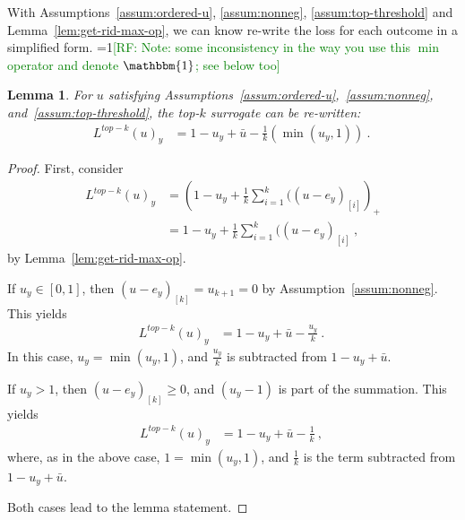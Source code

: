 \documentclass[12pt]{article}
\newcommand{\Comments}{1}
\newcommand{\mynote}[2]{\ifnum\Comments=1\textcolor{#1}{#2}\fi}
\newcommand{\raf}[1]{\mynote{green}{[RF: #1]}}
\newcommand{\jessie}[1]{\mynote{purple}{[JF: #1]}}
\newcommand{\ubar}{\bar{u}}
\newcommand{\ones}{\mathbbm{1}}
\newtheorem{lemma}{Lemma}
\begin{document}
With Assumptions~\ref{assum:ordered-u}, \ref{assum:nonneg}, \ref{assum:top-threshold} and Lemma~\ref{lem:get-rid-max-op}, we can know re-write the loss for each outcome in a simplified form.
\raf{Note: some inconsistency in the way you use this $\min$ operator and denote $\ones$; see below too}
\begin{lemma}\label{lem:new-form-surrogate}
	For $u$ satisfying Assumptions~\ref{assum:ordered-u},~\ref{assum:nonneg}, and~\ref{assum:top-threshold}, the top-$k$ surrogate can be re-written:
\begin{align*} 
L^{top-k}(u)_y  &= 1 - u_y + \bar u - \frac{1}{k}(\min(u_y, 1))~.~
\end{align*}
\end{lemma}
\begin{proof}
	First, consider
\begin{align*}
	L^{top-k}(u)_y &= \left(1 -u_y + \frac{1}{k} \sum_{i=1}^k ((u - e_y)_{[i]} \right)_+\\
	&= 1 -u_y + \frac{1}{k} \sum_{i=1}^k ((u - e_y)_{[i]}~,
	\end{align*}
	by Lemma~\ref{lem:get-rid-max-op}.

	
	If $u_y \in [0,1]$, then $(u-e_y)_{[k]} = u_{k+1} = 0$ by Assumption~\ref{assum:nonneg}.
	This yields
	\begin{align*}
	L^{top-k}(u)_y &= 1 - u_y + \bar u - \frac{u_y}{k}~.~
	\end{align*}
	In this case, $u_y = \min(u_y, 1)$, and $\frac {u_y}{k}$ is subtracted from $1 - u_y + \bar u$.

	If $u_y > 1$, then $(u-e_y)_{[k]} \geq 0$, and $(u_y - 1)$ is part of the summation.
	This yields
	\begin{align*}
	L^{top-k}(u)_y &= 1 - u_y + \bar u - \frac{1}{k}~,~
	\end{align*}
	where, as in the above case, $1 = \min(u_y, 1)$, and $\frac{1}{k}$ is the term subtracted from $1 - u_y + \bar u$.
	
	Both cases lead to the lemma statement.
\end{proof}


%
%
\end{document}

